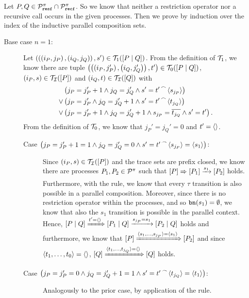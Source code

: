 \begin{prf}
Let $P,Q\in\mathcal P^{\pi}_{\mathtt{resf}}\cap\mathcal P^{\pi}_{\mathtt{recf}}$. So we know that neither a restriction operator nor a recursive call occurs in the given processes. Then we prove  by induction over the index of the inductive parallel composition sets.
\begin{description}
\item[Base case $n=1$:] Let $\left(\left(\left(i_P,j_P\right),\left(i_Q,j_Q\right)\right),s'\right)\in\mathcal T_{1}(\left[P \mid Q\right])$. From the definition of $\traces_1$, we know there are tuple $\left(\left(\left(i_P,j_P'\right),\left(i_Q,j_Q'\right)\right),t'\right)\in\mathcal T_{0}(\left[P \mid Q\right])$, $\left(i_P,s\right)\in\mathcal{T_I}(\left[P\right])$ and $\left(i_Q,t\right)\in\mathcal{T_I}(\left[Q\right])$ with
\begin{align*}
	&\left(j_P=j_P'+1\wedge j_Q=j_Q'\wedge s'={t'}^{\,\frown{}\,}{\langle s_{j_P}\rangle}\right) \\
	\vee&\left(j_P=j_P'\wedge j_Q=j_Q'+1\wedge s'={t'}^{\,\frown{}\,}{\langle t_{j_Q}\rangle}\right)\\
	\vee&\left(j_P=j_P'+1\wedge j_Q=j_Q'+1\wedge s_{j_P}=\overline{t_{j_Q}}\wedge s'=t'\right).
\end{align*}
From the definition of $\traces_0$, we know that $j_P'=j_Q'=0$ and $t'=\langle\rangle$.
	\begin{description}
		\item[Case $\left(j_P=j_P'+1=1\wedge j_Q=j_Q'=0\wedge s'={t'}^{\,\frown{}\,}{\langle s_{j_P}\rangle}=\langle s_1\rangle\right)$:] Since $\left(i_P,s\right)\in\mathcal{T_I}(\left[P\right])$ and the trace sets are prefix closed, we know there are processes $P_1,P_2\in\mathcal P^{\pi}$ such that $\left[P\right]\xRightarrow{}\left[P_1\right]\xrightarrow{s_1}\left[P_2\right]$ holds. Furthermore, with the \eparl{} rule, we know that every $\tau$ transition is also possible in a parallel composition. Moreover, since there is no restriction operator within the processes, and so $\mathtt{bn}(s_1)=\emptyset$, we know that also the $s_1$ transition is possible in the parallel context. Hence, $\left[P \mid Q\right]\xRightarrow{t'=\langle\rangle{}}\left[P_1 \mid Q\right]\xrightarrow{s_{j_P}=s_1}\left[P_2 \mid Q\right]$ holds and furthermore, we know that $\left[P\right]\xRightarrow{\langle s_1,\ldots,s_{j_P}\rangle=\langle s_1\rangle}\left[P_2\right]$ and since $\langle t_1,\ldots,t_0\rangle=\langle\rangle$, $\left[Q\right]\xRightarrow{\langle t_1,\ldots,t_{j_Q}\rangle=\langle\rangle}\left[Q\right]$ holds.
		
		\item[Case $\left(j_P=j_P'=0\wedge j_Q=j_Q'+1=1\wedge s'={t'}^{\,\frown{}\,}{\langle t_{j_Q}\rangle}=\langle t_1\rangle\right)$:] Analogously to the prior case, by application of the \eparr{} rule.


\end{description}
\end{description}
\end{prf}
